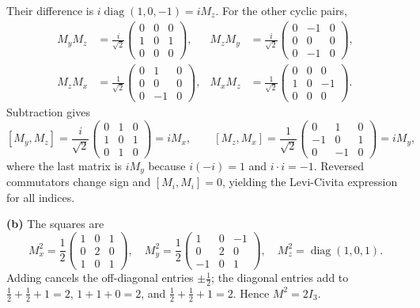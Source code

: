 Their difference is $i\operatorname{diag}(1,0,-1)=iM_z$.
For the other cyclic pairs,
\[
\begin{aligned}
M_yM_z&=\frac i{\sqrt2}\begin{pmatrix}0&0&0\\1&0&1\\0&0&0\end{pmatrix},
&
M_zM_y&=\frac i{\sqrt2}\begin{pmatrix}0&-1&0\\0&0&0\\0&-1&0\end{pmatrix},\\
M_zM_x&=\frac1{\sqrt2}\begin{pmatrix}0&1&0\\0&0&0\\0&-1&0\end{pmatrix},
&
M_xM_z&=\frac1{\sqrt2}\begin{pmatrix}0&0&0\\1&0&-1\\0&0&0\end{pmatrix}.
\end{aligned}
\]
Subtraction gives
\[
[M_y,M_z]=\frac i{\sqrt2}\begin{pmatrix}0&1&0\\1&0&1\\0&1&0\end{pmatrix}
=iM_x,\qquad
[M_z,M_x]=\frac1{\sqrt2}\begin{pmatrix}0&1&0\\-1&0&1\\0&-1&0\end{pmatrix}
=iM_y,
\]
where the last matrix is $iM_y$ because $i(-i)=1$ and $i\cdot i=-1$.
Reversed commutators change sign and $[M_i,M_i]=0$, yielding the
Levi-Civita expression for all indices.

\textbf{(b)} The squares are
\[
M_x^2=\frac12\begin{pmatrix}1&0&1\\0&2&0\\1&0&1\end{pmatrix},
\quad
M_y^2=\frac12\begin{pmatrix}1&0&-1\\0&2&0\\-1&0&1\end{pmatrix},
\quad M_z^2=\operatorname{diag}(1,0,1).
\]
Adding cancels the off-diagonal entries $\pm\frac12$; the diagonal
entries add to $\frac12+\frac12+1=2$, $1+1+0=2$, and
$\frac12+\frac12+1=2$. Hence $\boxed{M^2=2I_3}$.

